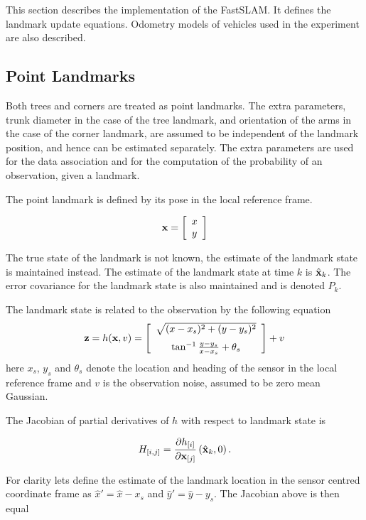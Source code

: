 This section describes the implementation of the FastSLAM. It defines
the landmark update equations. Odometry models of vehicles used in the
experiment are also described.


\subsection{Point Landmarks}

Both trees and corners are treated as point landmarks. The extra
parameters, trunk diameter in the case of the tree landmark, and
orientation of the arms in the case of the corner landmark, are
assumed to be independent of the landmark position, and hence can be
estimated separately. The extra parameters are used for the data
association and for the computation of the probability of an
observation, given a landmark.

The point landmark is defined by its pose in the local reference
frame.

$$
{\bf x} = \left[ \begin{array}{c} x\\y \end{array} \right]
$$

The true state of the landmark is not known, the estimate of the landmark
state is maintained instead. The estimate of the landmark state at
time $k$ is $\hat{\bf x}_k$. The error covariance for the landmark
state is also maintained and is denoted $P_k$.

The landmark state is related to the observation by the following equation
$$
  {\bf z} = h({\bf x},v) = \left[
\begin{array}{c}
\sqrt{(x-x_s)^2 + (y-y_s)^2}\\ \noalign{\medskip}
\tan^{-1} \frac{y-y_s}{x-x_s} + \theta_s
\end{array}
\right] + v
$$
here $x_s$, $y_s$ and $\theta_s$ denote the location and heading of
the sensor in the local reference frame and $v$ is the observation noise,
assumed to be zero mean Gaussian.

The Jacobian of partial derivatives of $h$ with respect to landmark
state is

$$
H_{[i,j]} = \frac{\partial h_{[i]}}{\partial {\bf x}_{[j]}}
             \left(\hat{\bf x}_k , 0 \right).
$$

For clarity lets define the estimate of the landmark location in the
sensor centred coordinate frame as $\hat{x}' = \hat{x} - x_s$ and
$\hat{y}' = \hat{y} - y_s$. The Jacobian above is then equal

